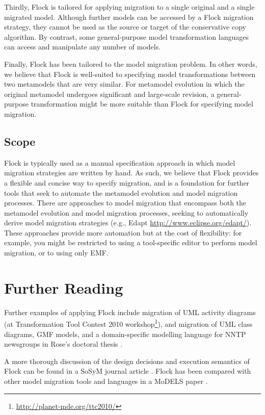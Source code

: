 Thirdly, Flock is tailored for applying migration to a single original and a single migrated model. Although further models can be accessed by a Flock migration strategy, they cannot be used as the source or target of the conservative copy algorithm. By contrast, some general-purpose model transformation languages can access and manipulate any number of models.

Finally, Flock has been tailored to the model migration problem. In other words, we believe that Flock is well-suited to specifying model transformations between two metamodels that are very similar. For metamodel evolution in which the original metamodel undergoes significant and large-scale revision, a general-purpose transformation might be more suitable than Flock for specifying model migration.

\subsection{Scope}
Flock is typically used as a manual specification approach in which model migration strategies are written by hand. As such, we believe that Flock provides a flexible and concise way to specify migration, and is a foundation for further tools that seek to automate the metamodel evolution and model migration processes. There are approaches to model migration that encompass both the metamodel evolution and model migration processes, seeking to automatically derive model migration strategies (e.g., Edapt \url{http://www.eclipse.org/edapt/}). These approaches provide more automation but at the cost of flexibility: for example, you might be restricted to using a tool-specific editor to perform model migration, or to using only EMF.


\section{Further Reading}
Further examples of applying Flock include migration of UML activity diagrams (at Transformation Tool Contest 2010 workshop\footnote{\url{http://planet-mde.org/ttc2010/}}), and migration of UML class diagrams, GMF models, and a domain-specific modelling language for NNTP newsgroups in Rose's doctoral thesis \cite{rose11thesis}.

A more thorough discussion of the design decisions and execution semantics of Flock can be found in a SoSyM journal article \cite{rose12flock}. Flock has been compared with other model migration tools and languages in a MoDELS paper \cite{rose10comparison}. 
